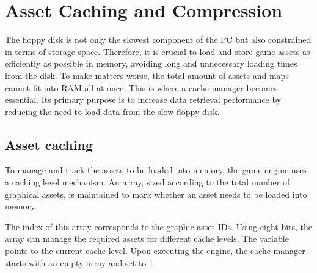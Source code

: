 \documentclass[book.tex]{subfiles}
\begin{document}
\label{chapter_cache_compression}
\section{Asset Caching and Compression}

The floppy disk is not only the slowest component of the PC but also constrained in terms of storage space. Therefore, it is crucial to load and store game assets as efficiently as possible in memory, avoiding long and unnecessary loading times from the disk. To make matters worse, the total amount of assets and maps cannot fit into RAM all at once. This is where a cache manager becomes essential. Its primary purpose is to increase data retrieval performance by reducing the need to load data from the slow floppy disk. \\

\subsection{Asset caching}
To manage and track the assets to be loaded into memory, the game engine uses a caching level mechanism. An array, sized according to the total number of graphical assets, is maintained to mark whether an asset needs to be loaded into memory. \\

 
\par
The index of this array corresponds to the graphic asset IDs. Using eight bits, the array can manage the required assets for different cache levels. The  variable points to the current cache level. Upon executing the engine, the cache manager starts with an empty array and  set to 1.\\
\end{document}
